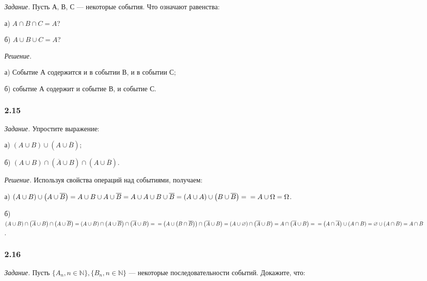 \documentclass{book}
\begin{document}
\textit{Задание.} Пусть А, В, С --- некоторые события.
Что означают равенства:

а) $ A \cap B \cap C = A $?

б) $ A \cup B \cup C = A $?

\textit{Решение.}

а) Событие А содержится и в событии В, и в событии С;

б) событие А содержит и событие В, и событие С.

\subsubsection*{2.15}

\textit{Задание.} Упростите выражение:

а) $ \left( A \cup B \right) \cup \left( A \cup \overline{ B } \right) $;

б) $ \left( A \cup B \right) \cap \left( \overline{ A } \cup B \right) \cap \left( A \cup \overline{ B } \right) $.

\textit{Решение.} Используя свойства операций над событиями, получаем:

а) $ \left( A \cup B \right) \cup \left( A \cup \overline{ B } \right) =
A \cup B \cup A \cup \overline{ B } =
A \cup A \cup B \cup \overline{ B } =
\left( A \cup A \right) \cup \left( B \cup \overline{ B } \right) = \\
= A \cup \Omega =
\Omega $.

б) $ \left( A \cup B \right) \cap \left( \overline{ A } \cup B \right) \cap \left( A \cup \overline{ B } \right) =
\left( A \cup B \right) \cap \left( A \cup \overline{ B } \right) \cap \left( \overline{ A } \cup B \right) = \\
= \left( A \cup \left( B \cap \overline{ B } \right) \right) \cap \left( \overline{ A } \cup B \right) =
\left( A \cup \varnothing \right) \cap \left( \overline{ A } \cup B \right) =
A \cap \left( \overline{ A } \cup B \right) = \\
= \left( A \cap \overline{ A } \right) \cup \left( A \cap B \right) =
\varnothing \cup \left( A \cap B \right) =
A \cap B $.

\subsubsection*{2.16}

\textit{Задание.} Пусть $ \{ A_n, n \in \mathbb{ N } \}, \{ B_n, n \in \mathbb{ N } \}$ --- некоторые последовательности событий.
Докажите, что:
\end{document}
